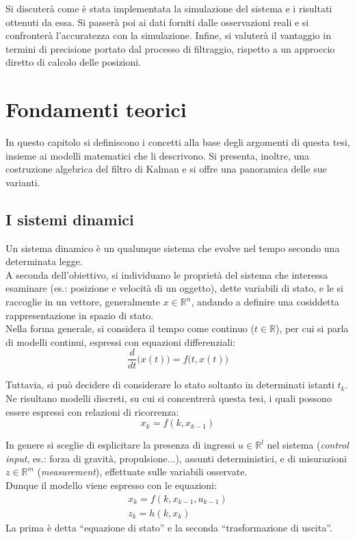 \documentclass[12pt,a4paper,openright,twoside]{book}
\begin{document}
Si discuterà come è stata implementata la simulazione del sistema e i risultati ottenuti da essa. Si passerà poi ai dati forniti dalle osservazioni reali e si confronterà l'accuratezza con la simulazione. Infine, si valuterà il vantaggio in termini di precisione portato dal processo di filtraggio, rispetto a un approccio diretto di calcolo delle posizioni.
\fi


\chapter{Fondamenti teorici}

In questo capitolo si definiscono i concetti alla base degli argomenti di questa tesi, insieme ai modelli matematici che li descrivono. Si presenta, inoltre, una costruzione algebrica del filtro di Kalman e si offre una panoramica delle sue varianti.

\section{I sistemi dinamici}

Un sistema dinamico è un qualunque sistema che evolve nel tempo secondo una determinata legge. \\

A seconda dell'obiettivo, si individuano le proprietà del sistema che interessa esaminare (es.: posizione e velocità di un oggetto), dette variabili di stato, e le si raccoglie in un vettore, generalmente $x\in\mathbb{R}^n$, andando a definire una cosiddetta rappresentazione in spazio di stato. \\
Nella forma generale, si considera il tempo come continuo ($t\in\mathbb{R}$), per cui si parla di modelli continui, espressi con equazioni differenziali:
$$\dfrac{d}{dt}\bigl(x(t)\bigr)=f\bigl(t,x(t)\bigr)$$ \pagebreak

Tuttavia, si può decidere di considerare lo stato soltanto in determinati istanti $t_k$. Ne risultano modelli discreti, su cui si concentrerà questa tesi, i quali possono essere espressi con relazioni di ricorrenza:
$$x_k=f(k,x_{k-1})$$

In genere si sceglie di esplicitare la presenza di ingressi $u\in\mathbb{R}^l$ nel sistema (\textit{control input}, es.: forza di gravità, propulsione...), assunti deterministici, e di misurazioni $z\in\mathbb{R}^m$ (\textit{measurement}), effettuate sulle variabili osservate. \\
Dunque il modello viene espresso con le equazioni:
\begin{gather*}
x_k=f(k,x_{k-1},u_{k-1}) \\
z_k=h(k,x_k)
\end{gather*}
La prima è detta ``equazione di stato'' e la seconda ``trasformazione di uscita''. \\
\end{document}
